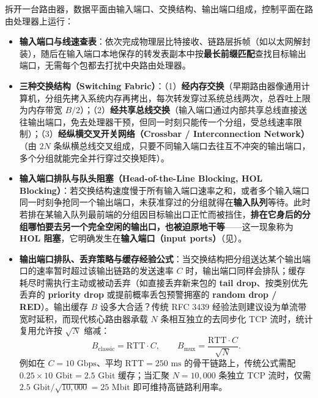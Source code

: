 拆开一台路由器，数据平面由输入端口、交换结构、输出端口组成，控制平面在路由处理器上运行：
\begin{itemize}
\item \textbf{输入端口与线速查表}：依次完成物理层比特接收、链路层拆帧（如以太网解封装），随后在输入端口本地保存的转发表副本中按\textbf{最长前缀匹配}查找目标输出端口，无需每个包都去打扰中央路由处理器。
\item \textbf{三种交换结构（Switching Fabric）}：（1）\textbf{经内存交换}（早期路由器像通用计算机，分组先拷入系统内存再拷出，每次转发穿过系统总线两次，总吞吐上限为内存带宽 $B/2$）；（2）\textbf{经共享总线交换}（输入端口通过内部共享总线直接送往输出端口，免去处理器干预，但同一时刻只能传一个分组，受总线速率限制）；（3）\textbf{经纵横交叉开关网络（Crossbar / Interconnection Network）}（由 $2N$ 条纵横总线交叉组成，只要不同输入端口去往互不冲突的输出端口，多个分组就能完全并行穿过交换矩阵）。
\item \textbf{输入端口排队与队头阻塞（Head-of-the-Line Blocking, HOL Blocking）}：若交换结构速度慢于所有输入端口速率之和，或者多个输入端口同一时刻争抢同一个输出端口，未获准穿过的分组就得在\textbf{输入队列}等待。此时若排在某输入队列最前端的分组因目标输出口正忙而被挡住，\textbf{排在它身后的分组哪怕要去另一个完全空闲的输出口，也被迫原地干等}——这一现象称为 \textbf{HOL 阻塞}，它明确发生在\textbf{输入端口（input ports）}（见）。
\item \textbf{输出端口排队、丢弃策略与缓存经验公式}：当交换结构把分组送达某个输出端口的速率暂时超过该输出链路的发送速率 $C$ 时，输出端口同样会排队；缓存耗尽时需执行主动或被动丢弃（如直接丢弃新来包的 \textbf{tail drop}、按类别优先丢弃的 \textbf{priority drop} 或提前概率丢包预警拥塞的 \textbf{random drop / RED}）。输出缓存 $B$ 设多大合适？传统 RFC 3439 经验法则建议设为单流带宽时延积，而现代核心路由器承载 $N$ 条相互独立的去同步化 TCP 流时，统计复用允许按 $\sqrt{N}$ 缩减：
\[
B_{\mathrm{classic}} = \mathrm{RTT}\cdot C,
\qquad
B_{\mathrm{mux}} = \frac{\mathrm{RTT}\cdot C}{\sqrt{N}}.
\tag{4.1}
\]
例如在 $C = 10\text{ Gbps}$、平均 $\mathrm{RTT} = 250\text{ ms}$ 的骨干链路上，传统公式需配 $0.25\times 10\text{ Gbit} = 2.5\text{ Gbit}$ 缓存；当汇聚 $N = 10{,}000$ 条独立 TCP 流时，仅需 $2.5\text{ Gbit} / \sqrt{10{,}000} = 25\text{ Mbit}$ 即可维持高链路利用率。
\end{itemize}

